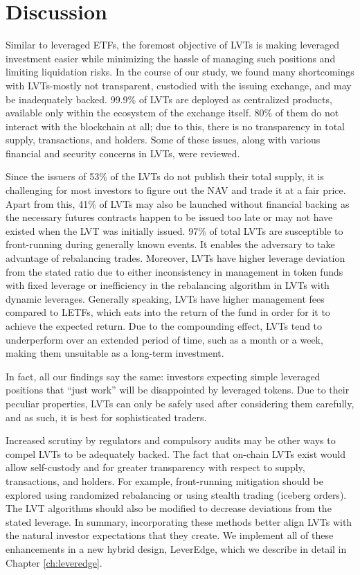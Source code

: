 \section{Discussion}
Similar to leveraged ETFs, the foremost objective of LVTs is making leveraged investment easier while minimizing the hassle of managing such positions and limiting liquidation risks. In the course of our study, we found many shortcomings with LVTs-mostly not transparent, custodied with the issuing exchange, and may be inadequately backed. 99.9\% of LVTs are deployed as centralized products, available only within the ecosystem of the exchange itself. 80\% of them do not interact with the blockchain at all; due to this, there is no transparency in total supply, transactions, and holders. Some of these issues, along with various financial and security concerns in LVTs, were reviewed.

Since the issuers of 53\% of the LVTs do not publish their total supply, it is challenging for most investors to figure out the NAV and trade it at a fair price. Apart from this, 41\% of LVTs may also be launched without financial backing as the necessary futures contracts happen to be issued too late or may not have existed when the LVT was initially issued. 97\% of total LVTs are susceptible to front-running during generally known events. It enables the adversary to take advantage of rebalancing trades. Moreover, LVTs have higher leverage deviation from the stated ratio due to either inconsistency in management in token funds with fixed leverage or inefficiency in the rebalancing algorithm in LVTs with dynamic leverages. Generally speaking, LVTs have higher management fees compared to LETFs, which eats into the return of the fund in order for it to achieve the expected return. Due to the compounding effect, LVTs tend to underperform over an extended period of time, such as a month or a week, making them unsuitable as a long-term investment.

In fact, all our findings say the same: investors expecting simple leveraged positions that ``just work'' will be disappointed by leveraged tokens. Due to their peculiar properties, LVTs can only be safely used after considering them carefully, and as such, it is best for sophisticated traders.

Increased scrutiny by regulators and compulsory audits may be other ways to compel LVTs to be adequately backed. The fact that on-chain LVTs exist would allow self-custody and for greater transparency with respect to supply, transactions, and holders. For example, front-running mitigation should be explored using randomized rebalancing or using stealth trading (\eg iceberg orders). The LVT algorithms should also be modified to decrease deviations from the stated leverage. In summary, incorporating these methods better align LVTs with the natural investor expectations that they create. We implement all of these enhancements in a new hybrid design, LeverEdge, which we describe in detail in Chapter \ref{ch:leveredge}.